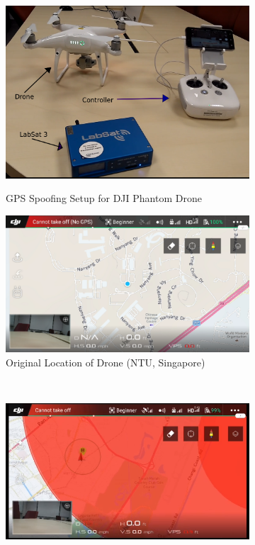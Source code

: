 \documentclass[conference]{IEEEtran}
\begin{document}
\begin{figure}[!hbt]
	\centering
	
	
	\begin{subfigure}{.45\textwidth}
		\centering
		\includegraphics[width=0.7\columnwidth]{images/setup} 
		\label{fig:setup}
		\caption{GPS Spoofing Setup for DJI Phantom Drone}
	\end{subfigure} \hfil
	\begin{subfigure}{.45\textwidth}
		\centering
		\includegraphics[width=0.8\columnwidth]{ntu}
		\caption{Original Location of Drone (NTU, Singapore)}
		\label{fig:ntu}
	\end{subfigure}\\	
	\begin{subfigure}{.45\textwidth}
		\centering
		\includegraphics[width=0.8\columnwidth]{nfz}

\end{subfigure}
\end{figure}
\end{document}
